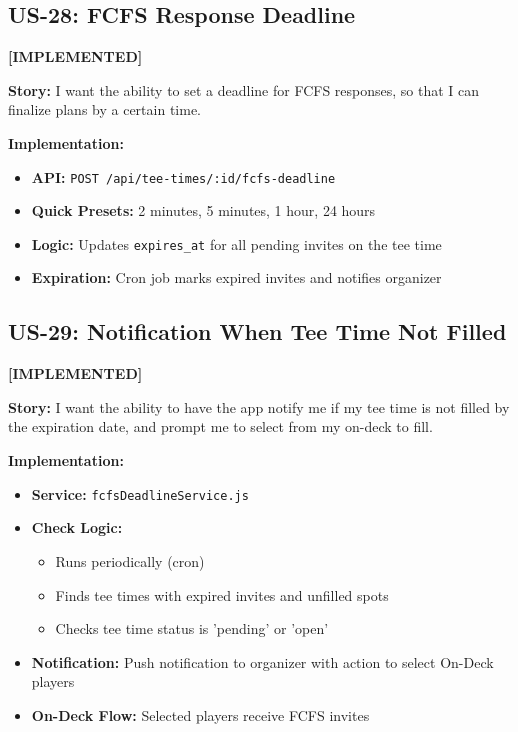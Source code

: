 \documentclass[11pt,a4paper]{article}
\newcommand{\implemented}{\textcolor{implemented}{\textbf{[IMPLEMENTED]}}}
\begin{document}
\subsection{US-28: FCFS Response Deadline}
\implemented

\textbf{Story:} I want the ability to set a deadline for FCFS responses, so that I can finalize plans by a certain time.

\textbf{Implementation:}
\begin{itemize}[leftmargin=*]
  \item \textbf{API:} \texttt{POST /api/tee-times/:id/fcfs-deadline}
  \item \textbf{Quick Presets:} 2 minutes, 5 minutes, 1 hour, 24 hours
  \item \textbf{Logic:} Updates \texttt{expires\_at} for all pending invites on the tee time
  \item \textbf{Expiration:} Cron job marks expired invites and notifies organizer
\end{itemize}

\subsection{US-29: Notification When Tee Time Not Filled}
\implemented

\textbf{Story:} I want the ability to have the app notify me if my tee time is not filled by the expiration date, and prompt me to select from my on-deck to fill.

\textbf{Implementation:}
\begin{itemize}[leftmargin=*]
  \item \textbf{Service:} \texttt{fcfsDeadlineService.js}
  \item \textbf{Check Logic:}
    \begin{itemize}
      \item Runs periodically (cron)
      \item Finds tee times with expired invites and unfilled spots
      \item Checks tee time status is 'pending' or 'open'
    \end{itemize}
  \item \textbf{Notification:} Push notification to organizer with action to select On-Deck players
  \item \textbf{On-Deck Flow:} Selected players receive FCFS invites
\end{itemize}

\end{document}
